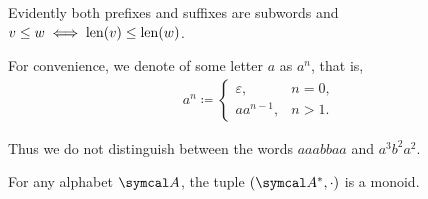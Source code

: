 \begin{definition}
  Evidently both prefixes and suffixes are subwords and \( v \leq w \iff \operatorname{len}(v) \leq \operatorname{len}(w) \).

  For convenience, we denote  of some letter \( a \) as \( a^n \), that is,
  \begin{align*}
    a^n \coloneqq \begin{cases}
      \varepsilon, &n = 0, \\
      a a^{n-1}, &n > 1.
    \end{cases}
  \end{align*}

  Thus we do not distinguish between the words \( aaabbaa \) and \( a^3 b^2 a^2 \).
\end{definition}

\begin{proposition}\label{thm:set_of_all_words_is_monoid}
  For any alphabet \( \Cal{A} \), the tuple \( (\Cal{A}^{*}, \cdot) \) is a monoid.
\end{proposition}
